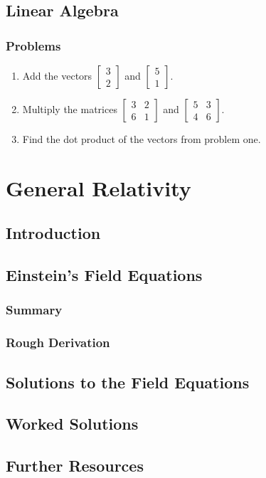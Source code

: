 \documentclass{memoir}
\begin{document}
\chapter{Linear Algebra}

\section{Problems}
\begin{enumerate}
\item Add the vectors $\begin{bmatrix}3\\2\end{bmatrix}$ and $\begin{bmatrix}5\\1\end{bmatrix}$.
\item Multiply the matrices $\begin{bmatrix}3&2\\6&1\end{bmatrix}$ and $\begin{bmatrix}5&3\\4&6\end{bmatrix}$.
\item Find the dot product of the vectors from problem one.
\end{enumerate}
\part{General Relativity}
\chapter{Introduction}

\chapter{Einstein's Field Equations}
\section{Summary}

\section{Rough Derivation}

\chapter{Solutions to the Field Equations}


\appendix
\chapter{Worked Solutions}

\chapter{Further Resources}

\end{document}
